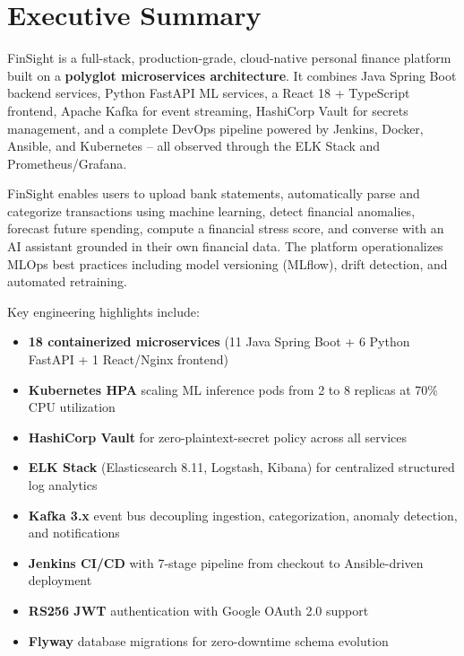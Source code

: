 \documentclass[12pt,a4paper]{report}
\begin{document}
\tableofcontents
\newpage

\chapter{Executive Summary}

\begin{infobox}
FinSight is a full-stack, production-grade, cloud-native personal finance platform built on a \textbf{polyglot microservices architecture}. It combines Java Spring Boot backend services, Python FastAPI ML services, a React 18 + TypeScript frontend, Apache Kafka for event streaming, HashiCorp Vault for secrets management, and a complete DevOps pipeline powered by Jenkins, Docker, Ansible, and Kubernetes -- all observed through the ELK Stack and Prometheus/Grafana.
\end{infobox}

FinSight enables users to upload bank statements, automatically parse and categorize transactions using machine learning, detect financial anomalies, forecast future spending, compute a financial stress score, and converse with an AI assistant grounded in their own financial data. The platform operationalizes MLOps best practices including model versioning (MLflow), drift detection, and automated retraining.

Key engineering highlights include:
\begin{itemize}[leftmargin=1.5em]
  \item \textbf{18 containerized microservices} (11 Java Spring Boot + 6 Python FastAPI + 1 React/Nginx frontend)
  \item \textbf{Kubernetes HPA} scaling ML inference pods from 2 to 8 replicas at 70\% CPU utilization
  \item \textbf{HashiCorp Vault} for zero-plaintext-secret policy across all services
  \item \textbf{ELK Stack} (Elasticsearch 8.11, Logstash, Kibana) for centralized structured log analytics
  \item \textbf{Kafka 3.x} event bus decoupling ingestion, categorization, anomaly detection, and notifications
  \item \textbf{Jenkins CI/CD} with 7-stage pipeline from checkout to Ansible-driven deployment
  \item \textbf{RS256 JWT} authentication with Google OAuth 2.0 support
  \item \textbf{Flyway} database migrations for zero-downtime schema evolution
\end{itemize}
\end{document}
